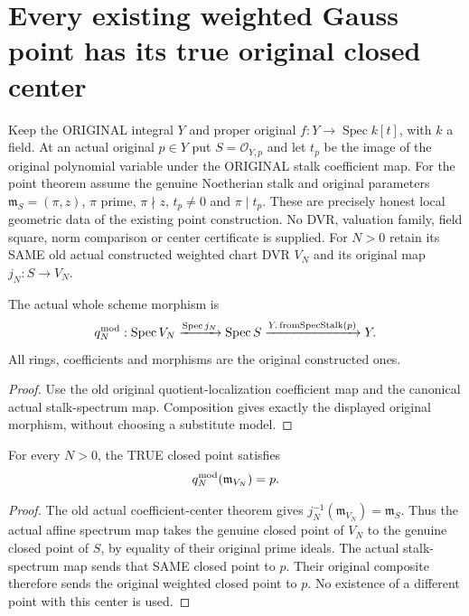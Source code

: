 \section{Every existing weighted Gauss point has its true original closed center}

Keep the ORIGINAL integral $Y$ and proper original
$f:Y\to\operatorname{Spec}k[t]$, with $k$ a field. At an actual original
$p\in Y$ put $S=\mathcal O_{Y,p}$ and let $t_p$ be the image of the
original polynomial variable under the ORIGINAL stalk coefficient map.
For the point theorem assume the genuine Noetherian stalk and original
parameters $\mathfrak m_S=(\pi,z)$, $\pi$ prime, $\pi\nmid z$,
$t_p\ne0$ and $\pi\mid t_p$. These are precisely honest local geometric
data of the existing point construction. No DVR, valuation family,
field square, norm comparison or center certificate is supplied.
For $N>0$ retain its SAME old actual constructed weighted chart DVR $V_N$
and its original map $j_N:S\to V_N$.

\begin{definition}
\label{def:gauss-weighted-original-dvr-morphism}
\leanok
The actual whole scheme morphism is
\[
 q_N^{\rm mod}:\operatorname{Spec}V_N
    \xrightarrow{\operatorname{Spec}j_N}\operatorname{Spec}S
    \xrightarrow{Y.\operatorname{fromSpecStalk}(p)}Y.
\]
All rings, coefficients and morphisms are the original constructed ones.
\end{definition}
\begin{proof}
Use the old original quotient-localization coefficient map and the
canonical actual stalk-spectrum map. Composition gives exactly the
displayed original morphism, without choosing a substitute model.
\end{proof}

\begin{lemma}
\label{lem:gauss-weighted-original-closed-point}
\leanok
For every $N>0$, the TRUE closed point satisfies
\[
 q_N^{\rm mod}(\mathfrak m_{V_N})=p.
\]
\end{lemma}
\begin{proof}
The old actual coefficient-center theorem gives
$j_N^{-1}(\mathfrak m_{V_N})=\mathfrak m_S$. Thus the actual affine
spectrum map takes the genuine closed point of $V_N$ to the genuine
closed point of $S$, by equality of their original prime ideals.
The actual stalk-spectrum map sends that SAME closed point to $p$.
Their original composite therefore sends the original weighted closed
point to $p$. No existence of a different point with this center is used.
\end{proof}

